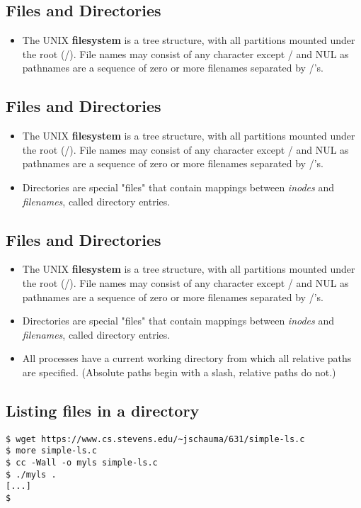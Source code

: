 \documentclass[sxga]{xdvislides}
\begin{document}
\subsection{Files and Directories}
\begin{itemize}
	\item The UNIX {\bf filesystem} is a tree structure, with all partitions
		mounted under the root (/). File names may consist of any
		character except / and NUL as pathnames are a sequence of
		zero or more filenames separated by /'s.
\end{itemize}

\subsection{Files and Directories}
\begin{itemize}
	\item The UNIX {\bf filesystem} is a tree structure, with all partitions
		mounted under the root (/). File names may consist of any
		character except / and NUL as pathnames are a sequence of
		zero or more filenames separated by /'s.
	\item Directories are special "files" that contain mappings
		between {\em inodes} and {\em filenames}, called directory
		entries.
\end{itemize}


\subsection{Files and Directories}
\begin{itemize}
	\item The UNIX {\bf filesystem} is a tree structure, with all partitions
		mounted under the root (/). File names may consist of any
		character except / and NUL as pathnames are a sequence of
		zero or more filenames separated by /'s.
	\item Directories are special "files" that contain mappings
		between {\em inodes} and {\em filenames}, called directory
		entries.
	\item All processes have a current working directory from which
		all relative paths are specified. (Absolute paths begin
		with a slash, relative paths do not.)
\end{itemize}

\subsection{Listing files in a directory}
\vspace*{\fill}
\begin{verbatim}
$ wget https://www.cs.stevens.edu/~jschauma/631/simple-ls.c
$ more simple-ls.c
$ cc -Wall -o myls simple-ls.c
$ ./myls .
[...]
$
\end{verbatim}
\vspace*{\fill}
\end{document}
